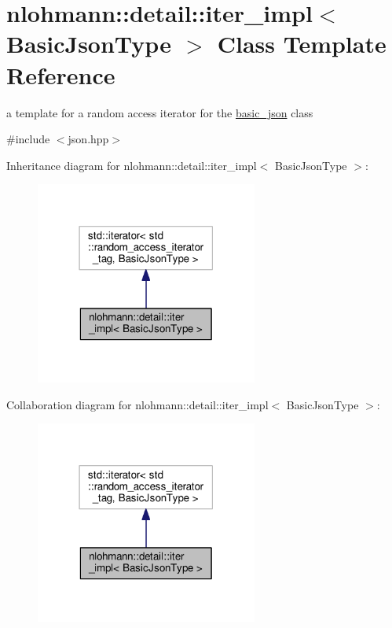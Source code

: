 \hypertarget{classnlohmann_1_1detail_1_1iter__impl}{}\section{nlohmann\+:\+:detail\+:\+:iter\+\_\+impl$<$ Basic\+Json\+Type $>$ Class Template Reference}
\label{classnlohmann_1_1detail_1_1iter__impl}


a template for a random access iterator for the \hyperlink{classnlohmann_1_1basic__json}{basic\+\_\+json} class  




{\ttfamily \#include $<$json.\+hpp$>$}



Inheritance diagram for nlohmann\+:\+:detail\+:\+:iter\+\_\+impl$<$ Basic\+Json\+Type $>$\+:\nopagebreak
\begin{figure}[H]
\begin{center}
\leavevmode
\includegraphics[width=207pt]{classnlohmann_1_1detail_1_1iter__impl__inherit__graph}
\end{center}
\end{figure}


Collaboration diagram for nlohmann\+:\+:detail\+:\+:iter\+\_\+impl$<$ Basic\+Json\+Type $>$\+:\nopagebreak
\begin{figure}[H]
\begin{center}
\leavevmode
\includegraphics[width=207pt]{classnlohmann_1_1detail_1_1iter__impl__coll__graph}
\end{center}
\end{figure}
